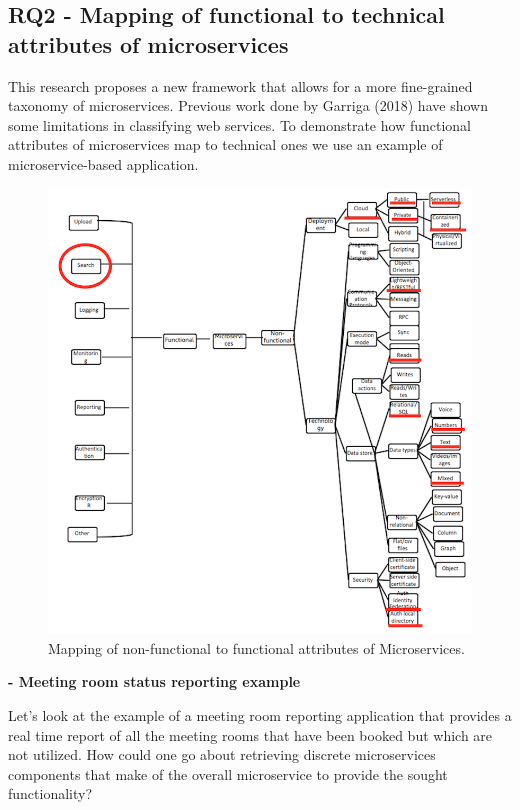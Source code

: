 \documentclass{article}
\begin{document}
\subsection{RQ2 - Mapping of functional to technical attributes of microservices}

This research proposes a new framework that allows for a more fine-grained taxonomy of microservices. Previous work done by Garriga (2018) have shown some limitations in classifying web services. To demonstrate how functional attributes of microservices map to technical ones we use an example of microservice-based application. 

\begin{figure}[h!]
\includegraphics{func2techmapping.png}
\caption{Mapping of non-functional to functional attributes of Microservices.}
\end{figure}


\textbf{- Meeting room status reporting example}

Let's look at the example of a meeting room reporting application that provides a real time report of all the meeting rooms that have been booked but which are not utilized. How could one go about retrieving discrete microservices components that make of the overall microservice to provide the sought functionality?
\end{document}

